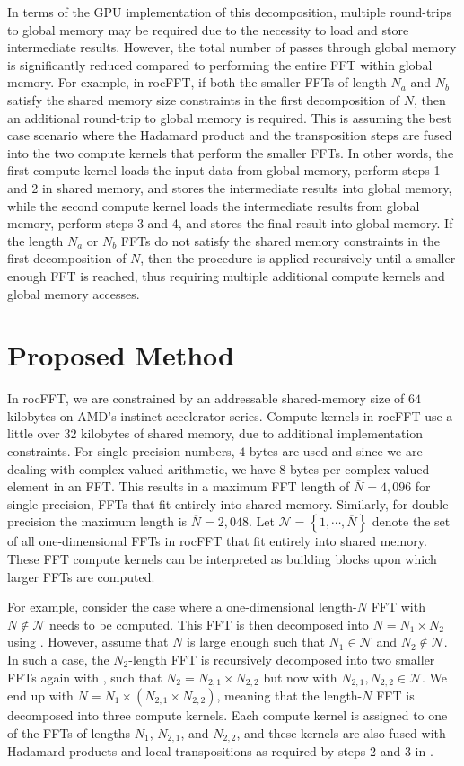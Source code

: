 \documentclass{gtac}
\theoremstyle{problemstyle}
\begin{document}
In terms of the GPU implementation of this decomposition, multiple round-trips to global memory may be required due to the necessity to load and store intermediate results. However, the total number of passes through global memory is significantly reduced compared to performing the entire FFT within global memory. For example, in rocFFT, if both the smaller FFTs of length $N_a$ and $N_b$ satisfy the shared memory size constraints in the first decomposition of $N$, then an additional round-trip to global memory is required. This is assuming the best case scenario where the Hadamard product and the transposition steps are fused into the two compute kernels that perform the smaller FFTs. In other words, the first compute kernel loads the input data from global memory, perform steps 1 and 2 in shared memory, and stores the intermediate results into global memory, while the second compute kernel loads the intermediate results from global memory, perform steps 3 and 4, and stores the final result into global memory. If the length $N_a$ or $N_b$ FFTs do not satisfy the shared memory constraints in the first decomposition of $N$, then the procedure is applied recursively until a smaller enough FFT is reached, thus requiring multiple additional compute kernels and global memory accesses.


\section{Proposed Method}

In rocFFT, we are constrained by an addressable shared-memory size of
$64$ kilobytes on AMD's instinct accelerator series. Compute kernels in rocFFT use
a little over $32$ kilobytes of shared memory, due to additional
implementation constraints. For single-precision numbers, $4$ bytes
are used and since we are dealing with complex-valued arithmetic, we
have $8$ bytes per complex-valued element in an FFT. This results in a
maximum FFT length of $\overline{N} = 4,096$ for single-precision, FFTs
that fit entirely into shared memory. Similarly, for double-precision
the maximum length is $\overline{N} = 2,048$. Let $\mathcal{N} = \left\{
1, \cdots, \overline{N} \right\}$ denote the set of all one-dimensional
FFTs in rocFFT that fit entirely into shared memory. These FFT compute
kernels can be interpreted as building blocks upon which larger FFTs
are computed.

For example, consider the case where a one-dimensional length-$N$ FFT with $N \notin \mathcal{N}$ needs to be computed. This FFT is then decomposed into $N = N_1 \times N_2$ using . However, assume that $N$ is large enough such that $N_1 \in \mathcal{N}$ and $N_2 \notin \mathcal{N}$. In such a case, the $N_2$-length FFT is recursively decomposed into two smaller FFTs again with , such that $N_2 = N_{2,1} \times N_{2,2}$ but now with $N_{2,1}, N_{2,2} \in \mathcal{N}$. We end up with $N = N_1 \times (N_{2,1} \times N_{2,2})$, meaning that the length-$N$ FFT is decomposed into three compute kernels. Each compute kernel is assigned to one of the FFTs of lengths $N_1$, $N_{2,1}$, and $N_{2,2}$, and these kernels are also fused with Hadamard products and local transpositions as required by steps 2 and 3 in . 
\end{document}
